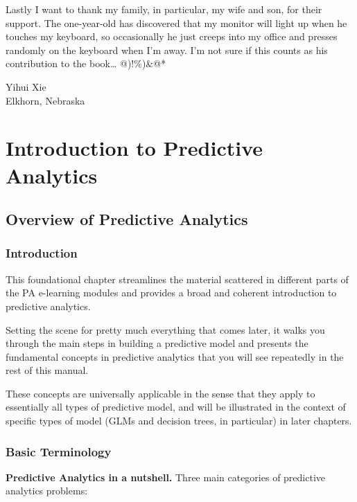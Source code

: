 \documentclass[
  10pt,
]{krantz}
\begin{document}
Lastly I want to thank my family, in particular, my wife and son, for their support. The one-year-old has discovered that my monitor will light up when he touches my keyboard, so occasionally he just creeps into my office and presses randomly on the keyboard when I'm away. I'm not sure if this counts as his contribution to the book\ldots{} @)!\%)\&@*

\begin{flushright}
Yihui Xie\\
Elkhorn, Nebraska
\end{flushright}

\part{Introduction to Predictive Analytics}\label{part-introduction-to-predictive-analytics}

\chapter{Overview of Predictive Analytics}\label{overview-of-predictive-analytics}

\section*{Introduction}\label{introduction}


This foundational chapter streamlines the material scattered in different parts
of the PA e-learning modules and provides a broad and coherent introduction to
predictive analytics.

Setting the scene for pretty much everything that comes later, it walks you
through the main steps in building a predictive model and presents the
fundamental concepts in predictive analytics that you will see repeatedly in the
rest of this manual.

These concepts are universally applicable in the sense that they apply to
essentially all types of predictive model, and will be illustrated in the
context of specific types of model (GLMs and decision trees, in particular) in
later chapters.

\section{Basic Terminology}\label{basic-terminology}

\textbf{Predictive Analytics in a nutshell.} Three main categories of predictive
analytics problems:
\end{document}
